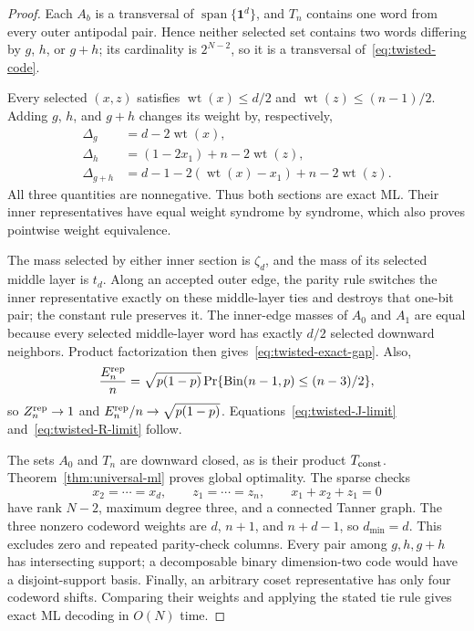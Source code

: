 \documentclass[journal]{IEEEtran}
\theoremstyle{definition}
\theoremstyle{remark}
\newcommand{\ind}{\mathbf 1}
\newcommand{\wt}{\operatorname{wt}}
\begin{document}
\begin{proof}
Each $A_b$ is a transversal of $\operatorname{span}\{\ind^d\}$, and $T_n$
contains one word from every outer antipodal pair.  Hence neither selected set
contains two words differing by $g$, $h$, or $g+h$; its cardinality is
$2^{N-2}$, so it is a transversal of~\eqref{eq:twisted-code}.

Every selected $(x,z)$ satisfies $\wt(x)\le d/2$ and
$\wt(z)\le(n-1)/2$.  Adding $g$, $h$, and $g+h$ changes its weight by,
respectively,
\begin{align}
 \Delta_g&=d-2\wt(x),\nonumber\\
 \Delta_h&=(1-2x_1)+n-2\wt(z),\nonumber\\
 \Delta_{g+h}&=d-1-2(\wt(x)-x_1)+n-2\wt(z).
 \label{eq:twisted-ml-differences}
\end{align}
All three quantities are nonnegative.  Thus both sections are exact ML.
Their inner representatives have equal weight syndrome by syndrome, which
also proves pointwise weight equivalence.

The mass selected by either inner section is $\zeta_d$, and the mass of its
selected middle layer is $t_d$.  Along an accepted outer edge, the parity rule
switches the inner representative exactly on these middle-layer ties and
destroys that one-bit pair; the constant rule preserves it.  The inner-edge
masses of $A_0$ and $A_1$ are equal because every selected middle-layer word
has exactly $d/2$ selected downward neighbors.  Product factorization then
gives~\eqref{eq:twisted-exact-gap}.  Also,
\begin{equation}
 \frac{E_n^{\rm rep}}n=\sqrt{p(1-p)}
 \Pr\{\operatorname{Bin}(n-1,p)\le(n-3)/2\},
 \label{eq:outer-E-limit}
\end{equation}
so $Z_n^{\rm rep}\to1$ and $E_n^{\rm rep}/n\to\sqrt{p(1-p)}$.
Equations~\eqref{eq:twisted-J-limit} and~\eqref{eq:twisted-R-limit} follow.

The sets $A_0$ and $T_n$ are downward closed, as is their product
$T_{\rm const}$.  Theorem~\ref{thm:universal-ml} proves global optimality.
The sparse checks
\begin{equation}
 x_2=\cdots=x_d,\qquad z_1=\cdots=z_n,\qquad
 x_1+x_2+z_1=0
 \label{eq:twisted-checks}
\end{equation}
have rank $N-2$, maximum degree three, and a connected Tanner graph.  The
three nonzero codeword weights are $d$, $n+1$, and $n+d-1$, so
$d_{\min}=d$.  This excludes zero and repeated parity-check columns.  Every
pair among $g,h,g+h$ has intersecting support; a decomposable binary
dimension-two code would have a disjoint-support basis.  Finally, an arbitrary
coset representative has only four codeword shifts.  Comparing their weights
and applying the stated tie rule gives exact ML decoding in $O(N)$ time.
\end{proof}
\end{document}
